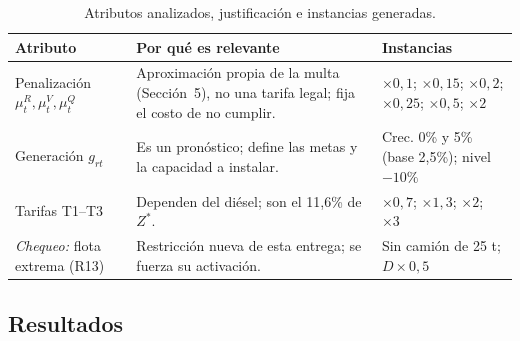 \documentclass[letterpaper]{article}
\begin{document}
\begin{table}[H]
\centering
\caption{Atributos analizados, justificación e instancias generadas.}
\label{tab:atributos}
\small
\setlength{\tabcolsep}{4pt}
\begin{tabularx}{\linewidth}{@{}>{\raggedright\arraybackslash}p{3.4cm}>{\raggedright\arraybackslash}X>{\raggedright\arraybackslash}p{3.6cm}@{}}
\hline
\textbf{Atributo} & \textbf{Por qué es relevante} & \textbf{Instancias} \\
\hline
Penalización $\mu^R_t,\mu^V_t,\mu^Q_t$ & Aproximación propia de la multa (Sección~5), no una tarifa legal; fija el costo de no cumplir. & $\times0,1$; $\times0,15$; $\times0,2$; $\times0,25$; $\times0,5$; $\times2$ \\
Generación $g_{rt}$ & Es un pronóstico; define las metas y la capacidad a instalar. & Crec. 0\% y 5\% (base 2,5\%); nivel $-10\%$ \\
Tarifas T1--T3 & Dependen del diésel; son el 11,6\% de $Z^*$. & $\times0,7$; $\times1,3$; $\times2$; $\times3$ \\
\textit{Chequeo:} flota extrema (R13) & Restricción nueva de esta entrega; se fuerza su activación. & Sin camión de 25 t; $D\times0,5$ \\
\hline
\end{tabularx}
\end{table}

\subsection{Resultados}
\end{document}
